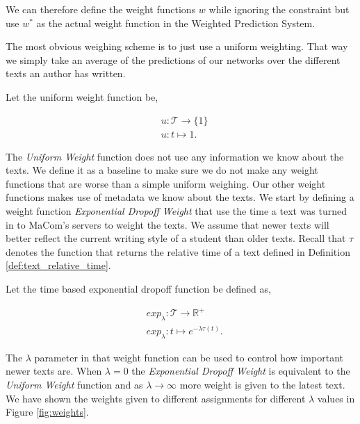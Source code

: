We can therefore define the weight functions $w$ while ignoring the constraint
but use $w^*$ as the actual weight function in the Weighted Prediction System.

The most obvious weighing scheme is to just use a uniform weighting. That way
we simply take an average of the predictions of our networks over the different
texts an author has written.

\begin{definition}
    \label{def:uniform_weight}

    Let the uniform weight function be,

    \begin{align}
        &u \colon \mathcal{T} \rightarrow \{ 1 \} \\
        &u \colon t \mapsto 1.
    \end{align}

\end{definition}

The \textit{Uniform Weight} function does not use any information we know about
the texts. We define it as a baseline to make sure we do not make any weight
functions that are worse than a simple uniform weighing. Our other weight
functions makes use of metadata we know about the texts. We start by defining
a weight function \textit{Exponential Dropoff Weight} that use the time a text
was turned in to MaCom's servers to weight the texts. We assume that newer texts
will better reflect the current writing style of a student than older texts.
Recall that $\tau$ denotes the function that returns the relative time of a text
defined in Definition \ref{def:text_relative_time}.

\begin{definition}
    \label{def:exponential_dropoff_weight}

    Let the time based exponential dropoff function be defined as,

    \begin{align}
        &exp_\lambda \colon \mathcal{T} \rightarrow \mathbb{R}^+ \\
        &exp_\lambda \colon t \mapsto e^{-\lambda \tau(t)}.
    \end{align}

\end{definition}

The $\lambda$ parameter in that weight function can be used to control how
important newer texts are. When $\lambda = 0$ the \textit{Exponential Dropoff
Weight} is equivalent to the \textit{Uniform Weight} function and as $\lambda
\rightarrow \infty$ more weight is given to the latest text. We have shown the
weights given to different assignments for different $\lambda$ values in Figure
\ref{fig:weights}.

